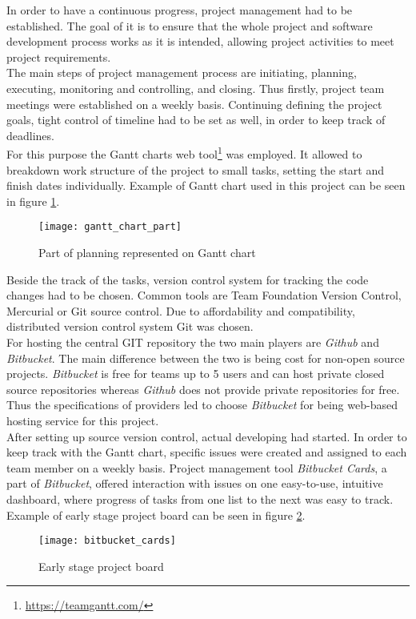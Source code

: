 In order to have a continuous progress, project management had to be established. The goal of it is to ensure that the whole project and software development process works as it is intended, allowing project activities to meet project requirements.
\\
The main steps of project management process are initiating, planning, executing, monitoring and controlling, and closing. Thus firstly, project team meetings were established on a weekly basis. Continuing defining the project goals, tight control of timeline had to be set as well, in order to keep track of deadlines.
\\
For this purpose the Gantt charts web tool\footnote{\url{https://teamgantt.com/}} was employed. It allowed to breakdown work structure of the project to small tasks, setting the start and finish dates individually. Example of Gantt chart used in this project can be seen in figure \ref{fig:gannt_example}.

\begin{figure}[ht!]
	\centering
	\texttt{[image: gantt\_chart\_part]}
	\caption{Part of planning represented on Gantt chart}
	\label{fig:gannt_example}
\end{figure}

Beside the track of the tasks, version control system for tracking the code changes had to be chosen. Common tools are Team Foundation Version Control, Mercurial or Git source control. Due to affordability and compatibility, distributed version control system Git was chosen. 
\\
For hosting the central GIT repository the two main players are \textit{Github} and \textit{Bitbucket}.
The main difference between the two is being cost for non-open source projects. \textit{Bitbucket} is free for teams up to 5 users and can host private closed source repositories whereas \textit{Github} does not provide private repositories for free. Thus the specifications of providers led to choose \textit{Bitbucket} for being web-based hosting service for this project.
\\
After setting up source version control, actual developing had started. In order to keep track with the Gantt chart, specific issues were created and assigned to each team member on a weekly basis. Project management tool \textit{Bitbucket Cards}, a part of \textit{Bitbucket}, offered interaction with issues on one easy-to-use, intuitive dashboard, where progress of tasks from one list to the next was easy to track.  Example of early stage project board can be seen in figure \ref{fig:bitcards}.

\begin{figure}[ht!]
	\centering
	\texttt{[image: bitbucket\_cards]}
	\caption{Early stage project board}
	\label{fig:bitcards}
\end{figure}
